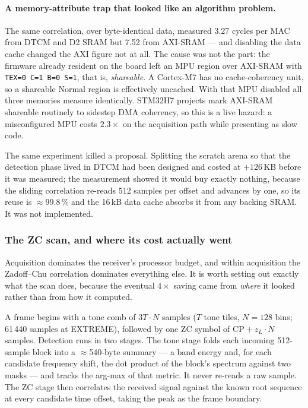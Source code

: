 \paragraph{A memory-attribute trap that looked like an algorithm
problem.}
The same correlation, over byte-identical data, measured 3.27 cycles
per MAC from DTCM and D2 SRAM but 7.52 from AXI-SRAM --- and disabling
the data cache changed the AXI figure not at all. The cause was not the
part: the firmware already resident on the board left an MPU region over
AXI-SRAM with \texttt{TEX=0 C=1 B=0 S=1}, that is, \emph{shareable}.
A Cortex-M7 has no cache-coherency unit, so a shareable Normal region is
effectively uncached. With that MPU disabled all three memories measure
identically. STM32H7 projects mark AXI-SRAM shareable routinely to
sidestep DMA coherency, so this is a live hazard: a misconfigured MPU
costs $2.3\times$ on the acquisition path while presenting as slow code.

The same experiment killed a proposal. Splitting the scratch arena so
that the detection phase lived in DTCM had been designed and costed at
$+126$\,KB before it was measured; the measurement showed it would buy
exactly nothing, because the sliding correlation re-reads 512 samples
per offset and advances by one, so its reuse is $\approx$99.8\,\% and
the 16\,kB data cache absorbs it from any backing SRAM. It was not
implemented.

\subsubsection{The ZC scan, and where its cost actually went}
\label{sec:zcscan}

Acquisition dominates the receiver's processor budget, and within
acquisition the Zadoff--Chu correlation dominates everything else. It is
worth setting out exactly what the scan does, because the eventual
$4\times$ saving came from \emph{where} it looked rather than from how
it computed.

A frame begins with a tone comb of $3T{\cdot}N$ samples ($T$ tone tiles,
$N=128$ bins; 61\,440 samples at EXTREME), followed by one ZC symbol of
$\mathrm{CP}+z_L{\cdot}N$ samples. Detection runs in two stages. The
tone stage folds each incoming 512-sample block into a $\approx$540-byte
summary --- a band energy and, for each candidate frequency shift, the
dot product of the block's spectrum against two masks --- and tracks the
arg-max of that metric. It never re-reads a raw sample. The ZC stage
then correlates the received signal against the known root sequence at
every candidate time offset, taking the peak as the frame boundary.

